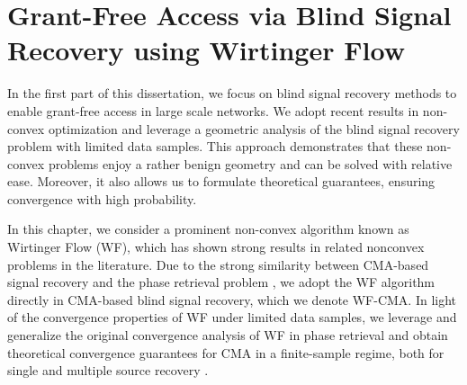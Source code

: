 \chapter{Grant-Free Access via Blind Signal Recovery using Wirtinger Flow}
\label{wfcma:chap}

In the first part of this dissertation, we focus on blind signal recovery methods to enable grant-free access in large scale networks.
We adopt recent results in non-convex optimization and leverage a geometric analysis of the blind signal recovery problem with limited data samples. This approach demonstrates that these non-convex problems enjoy a rather benign geometry and can be solved with relative ease. Moreover, it also allows us to formulate theoretical guarantees, ensuring convergence with high probability.  

In this chapter, we consider a prominent non-convex algorithm known as Wirtinger Flow (WF), which has shown strong results in related nonconvex problems in the literature. 
Due to the strong similarity between CMA-based signal recovery and the phase retrieval problem  \cite{Candes2015a_phaseretrievalWF}, we adopt the WF algorithm directly in CMA-based blind signal recovery, which we denote WF-CMA. 
In light of the convergence properties of WF under limited data samples, we leverage and generalize the original convergence analysis of WF in phase retrieval and obtain theoretical convergence guarantees for CMA in a finite-sample regime, both for single and multiple source recovery \cite{Feres2021WFCMA}.










